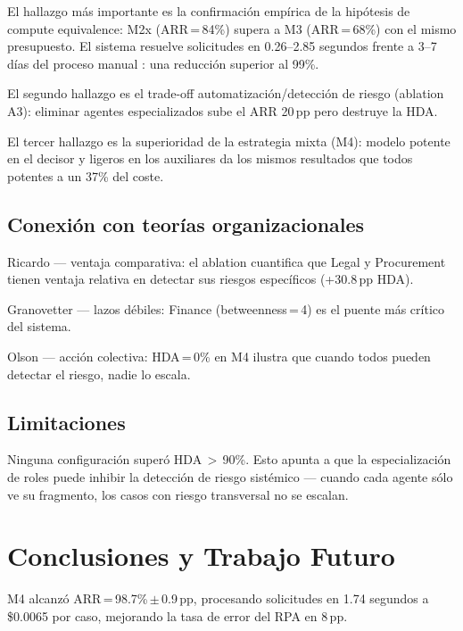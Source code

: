 \documentclass[preprint,12pt,authoryear]{elsarticle}
\begin{document}
El hallazgo m\'as importante es la confirmaci\'on emp\'irica de la hip\'otesis
de compute equivalence: M2x (ARR\,=\,84\%) supera a M3 (ARR\,=\,68\%) con el
mismo presupuesto.
El sistema resuelve solicitudes en 0.26--2.85 segundos frente a 3--7 d\'ias del
proceso manual \citep{hackett2023}: una reducci\'on superior al 99\%.

El segundo hallazgo es el trade-off automatizaci\'on/detecci\'on de riesgo
(ablation A3): eliminar agentes especializados sube el ARR 20\,pp pero destruye
la HDA.

El tercer hallazgo es la superioridad de la estrategia mixta (M4): modelo
potente en el decisor y ligeros en los auxiliares da los mismos resultados que
todos potentes a un 37\% del coste.

\subsection{Conexi\'on con teor\'ias organizacionales}

Ricardo \citeyearpar{ricardo1817} --- ventaja comparativa: el ablation cuantifica
que Legal y Procurement tienen ventaja relativa en detectar sus riesgos
espec\'ificos (+30.8\,pp HDA).

Granovetter \citeyearpar{granovetter1973} --- lazos d\'ebiles: Finance
(betweenness\,=\,4) es el puente m\'as cr\'itico del sistema.

Olson \citeyearpar{olson1965} --- acci\'on colectiva: HDA\,=\,0\% en M4 ilustra
que cuando todos pueden detectar el riesgo, nadie lo escala.

\subsection{Limitaciones}

Ninguna configuraci\'on super\'o HDA\,$>$\,90\%.
Esto apunta a que la especializaci\'on de roles puede inhibir la detecci\'on de
riesgo sist\'emico --- cuando cada agente s\'olo ve su fragmento, los casos con
riesgo transversal no se escalan.

\section{Conclusiones y Trabajo Futuro}
\label{sec:conclusiones}

M4 alcanz\'o ARR\,=\,98.7\%\,$\pm$\,0.9\,pp, procesando solicitudes en 1.74
segundos a \$0.0065 por caso, mejorando la tasa de error del RPA en 8\,pp.
\end{document}
